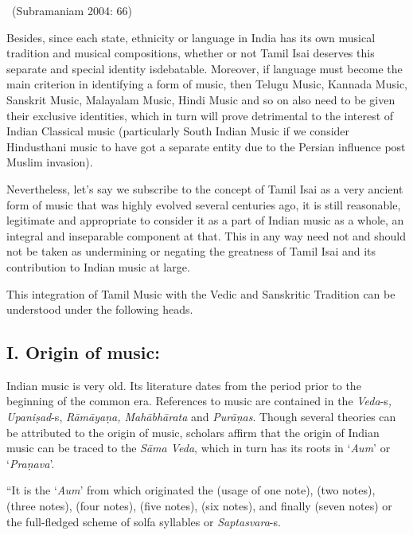 ~\hfill (Subramaniam 2004: 66)

Besides, since each state, ethnicity or language in India has its own musical tradition and musical compositions, whether or not Tamil Isai deserves this separate and special identity isdebatable. Moreover, if language must become the main criterion in identifying a form of music, then Telugu Music, Kannada Music, Sanskrit Music, Malayalam Music, Hindi Music and so on also need to be given their exclusive identities, which in turn will prove detrimental to the interest of Indian Classical music (particularly South Indian Music if we consider Hindusthani music to have got a separate entity due to the Persian influence post Muslim invasion).

Nevertheless, let’s say we subscribe to the concept of Tamil Isai as a very ancient form of music that was highly evolved several centuries ago, it is still reasonable, legitimate and appropriate to consider it as a part of Indian music as a whole, an integral and inseparable component at that. This in any way need not and should not be taken as undermining or negating the greatness of Tamil Isai and its contribution to Indian music at large.

This integration of Tamil Music with the Vedic and Sanskritic Tradition can be understood under the following heads.

\subsection*{I. Origin of music:}

Indian music is very old. Its literature dates from the period prior to the beginning of the common era. References to music are contained in the \textit{Veda}-s\textit{, Upaniṣad}-s, \textit{Rāmāyaṇa, Mahābhārata} and \textit{Purāṇas}. Though several theories can be attributed to the origin of music, scholars affirm that the origin of Indian music can be traced to the \textit{Sāma Veda}, which in turn has its roots in ‘\textit{Aum}’ or ‘\textit{Praṇava}’.

\begin{myquote}
“It is the ‘\textit{Aum}’ from which originated the  (usage of one note),  (two notes),  (three notes),  (four notes),  (five notes),  (six notes), and finally  (seven notes) or the full-fledged scheme of solfa syllables or \textit{Saptasvara}-s.
\end{myquote}

